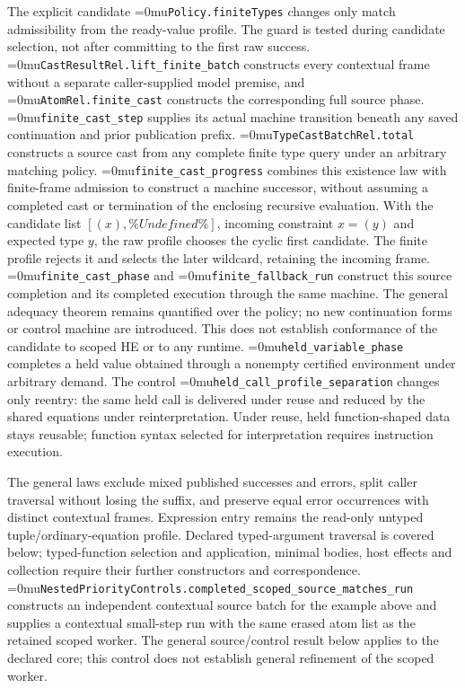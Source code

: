 \documentclass[11pt,a4paper]{article}
\newcommand{\name}[1]{\textup{\Urlmuskip=0mu\relax\nolinkurl{#1}}}
\begin{document}
The explicit candidate \name{Policy.finiteTypes} changes only match
admissibility from the ready-value profile. The guard is tested during
candidate selection, not after committing to the first raw success.
\name{CastResultRel.lift_finite_batch} constructs every contextual frame
without a separate caller-supplied model premise, and
\name{AtomRel.finite_cast} constructs the corresponding full source phase.
\name{finite_cast_step} supplies its actual machine transition beneath any
saved continuation and prior publication prefix.
\name{TypeCastBatchRel.total} constructs a source cast from any complete
finite type query under an arbitrary matching policy.
\name{finite_cast_progress} combines this existence law with finite-frame
admission to construct a machine successor, without assuming a completed
cast or termination of the enclosing recursive evaluation.
With the candidate list $[(x),\%Undefined\%]$, incoming constraint $x=(y)$
and expected type $y$, the raw profile chooses the cyclic first candidate.
The finite profile rejects it and selects the later wildcard, retaining the
incoming frame. \name{finite_cast_phase} and \name{finite_fallback_run}
construct this source completion and its completed execution through the same
machine. The general adequacy theorem remains quantified over the policy;
no new continuation forms or control machine are introduced. This does not
establish conformance of the candidate to scoped HE or to any runtime.
\name{held_variable_phase} completes a held value obtained through a
nonempty certified environment under arbitrary demand. The control
\name{held_call_profile_separation} changes only reentry: the same held
call is delivered under reuse and reduced by the shared equations under
reinterpretation. Under reuse, held function-shaped data stays reusable;
function syntax selected for interpretation requires instruction execution.

The general laws exclude mixed published successes and errors, split caller
traversal without losing the suffix, and preserve equal error occurrences with
distinct contextual frames. Expression entry remains the read-only untyped
tuple/ordinary-equation profile. Declared typed-argument traversal is covered
below; typed-function selection and application, minimal bodies, host effects
and collection require their further constructors and correspondence.
\name{NestedPriorityControls.completed_scoped_source_matches_run}
constructs an independent contextual source batch for the example above and
supplies a contextual small-step run with the same erased atom list as the
retained scoped worker. The general source/control result below applies to
the declared core; this control does not establish general refinement of
the scoped worker.
\end{document}
